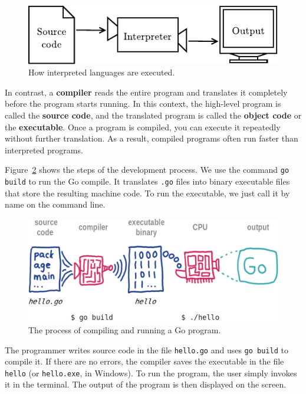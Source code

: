 \begin{figure}[!ht]
\begin{center}
\includegraphics{figs/interpreter.pdf}
\caption{How interpreted languages are executed.}
\label{fig.interpreter}
\end{center}
\end{figure}


In contrast, a {\bf compiler} reads the entire program and translates it completely before the program starts running.
In this context, the high-level program is called the {\bf source code}, and the translated program is called the {\bf object code} or the {\bf executable}.
Once a program is compiled, you can execute it repeatedly without further translation.
As a result, compiled programs often run faster than interpreted programs.

Figure~\ref{fig.compiler} shows the steps of the development process.
We use the command {\tt go build} to run the Go compile.
It translates {\tt .go} files into binary executable files that store the resulting machine code.
To run the executable, we just call it by name on the command line.

\begin{figure}[!ht]
\begin{center}
\includegraphics{figs/compiler.png}
\caption{The process of compiling and running a Go program.}
\label{fig.compiler}
\end{center}
\end{figure}

The programmer writes source code in the file {\tt hello.go} and uses {\tt go build} to compile it.
If there are no errors, the compiler saves the executable in the file {\tt hello} (or {\tt hello.exe}, in Windows).
To run the program, the user simply invokes it in the terminal.
The output of the program is then displayed on the screen.

